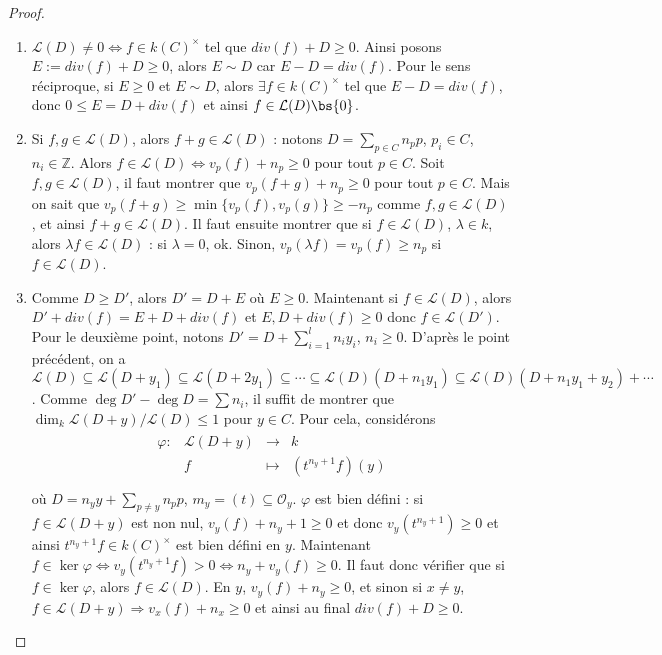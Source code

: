         \begin{proof}
            \begin{enumerate}
                \item $\mathcal{L}(D) \neq 0 \iff f \in k(C)^\times$ tel que $div(f) + D \geq 0$. Ainsi posons $E := div(f) + D \geq 0$, alors $E \sim D$ car $E - D = div(f)$. Pour le sens réciproque, si $E \geq 0$ et $E \sim D$, alors $\exists f \in k(C)^\times$ tel que $E - D = div(f)$, donc $0 \leq E = D + div(f)$ et ainsi $f \in \mathcal{L}(D) \bs \{0\}$.
                \item Si $f,g \in \mathcal{L}(D)$, alors $f + g \in \mathcal{L}(D)$ : notons $D = \sum_{p \in C} n_pp$, $p_i \in C$, $n_i \in \mathbb{Z}$. Alors $f \in \mathcal{L}(D) \iff v_p(f) + n_p \geq 0$ pour tout $p \in C$. Soit $f,g \in \mathcal{L}(D)$, il faut montrer que $v_p(f + g) + n_p \geq 0$ pour tout $p \in C$. Mais on sait que $v_p(f + g) \geq \min \{v_p(f), v_p(g)\} \geq -n_p$ comme $f,g \in \mathcal{L}(D)$, et ainsi $f + g \in \mathcal{L}(D)$. Il faut ensuite montrer que si $f \in \mathcal{L}(D)$, $\lambda \in k$, alors $\lambda f \in \mathcal{L}(D)$ : si $\lambda = 0$, ok. Sinon, $v_p(\lambda f) = v_p(f) \geq n_p$ si $f \in \mathcal{L}(D)$.
                \item Comme $D \geq D'$, alors $D' = D + E$ où $E \geq 0$. Maintenant si $f \in \mathcal{L}(D)$, alors $D' + div(f) = E + D + div(f)$ et $E, D + div(f) \geq 0$ donc $f \in \mathcal{L}(D')$. Pour le deuxième point, notons $D' = D + \sum_{i = 1} ^l n_iy_i$, $n_i \geq 0$. D'après le point précédent, on a $\mathcal{L}(D) \subseteq \mathcal{L}(D + y_1) \subseteq \mathcal{L}(D + 2y_1) \subseteq \cdots \subseteq \mathcal{L}(D)(D + n_1y_1) \subseteq \mathcal{L}(D)(D + n_1y_1 + y_2) + \cdots$. Comme $\deg D' - \deg D = \sum n_i$, il suffit de montrer que $\dim_k \mathcal{L}(D + y)/\mathcal{L}(D) \leq 1$ pour $y \in C$. Pour cela, considérons
                \begin{align*}
                    \begin{array}{cccc}
                        \varphi : & \mathcal{L}(D + y) & \to & k \\
                        & f & \mapsto & (t^{n_y + 1}f)(y)\\
                    \end{array}
                \end{align*}
                où $D = n_yy + \sum_{p \neq y} n_pp$, $m_y = (t) \subseteq \mathcal{O}_y$. $\varphi$ est bien défini : si $f \in \mathcal{L}(D + y)$ est non nul, $v_y(f) + n_y + 1 \geq 0$ et donc $v_y(t^{n_y + 1}) \geq 0$ et ainsi $t^{n_y + 1}f \in k(C)^\times$ est bien défini en $y$. Maintenant $f \in \ker \varphi \iff v_y(t^{n_y + 1}f) > 0 \iff n_y + v_y(f) \geq 0$. Il faut donc vérifier que si $f \in \ker \varphi$, alors $f \in \mathcal{L}(D)$. En $y$, $v_y(f) + n_y \geq 0$, et sinon si $x \neq y$, $f \in \mathcal{L}(D + y) \Rightarrow v_x(f) + n_x \geq 0$ et ainsi au final $div(f) + D \geq 0$.

\end{enumerate}
\end{proof}
